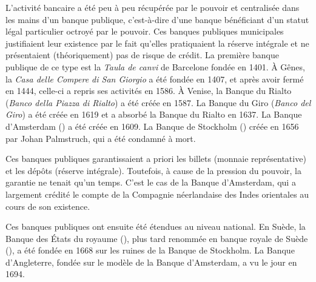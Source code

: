 

L'activité bancaire a été peu à peu récupérée par le pouvoir et centralisée dans les mains d'un banque publique, c'est-à-dire d'une banque bénéficiant d'un statut légal particulier octroyé par le pouvoir. Ces banques publiques municipales justifiaient leur existence par le fait qu'elles pratiquaient la réserve intégrale et ne présentaient (théoriquement) pas de risque de crédit. La première banque publique de ce type est la \emph{Taula de canvi} de Barcelone fondée en 1401. À Gênes, la \emph{Casa delle Compere di San Giorgio} a été fondée en 1407, et après avoir fermé en 1444, celle-ci a repris ses activités en 1586. À Venise, la Banque du Rialto (\emph{Banco della Piazza di Rialto}) a été créée en 1587. La Banque du Giro (\emph{Banco del Giro}) a été créée en 1619 et a absorbé la Banque du Rialto en 1637. La Banque d'Amsterdam () a été créée en 1609. La Banque de Stockholm () créée en 1656 par Johan Palmstruch, qui a été condamné à mort.

Ces banques publiques garantissaient a priori les billets (monnaie représentative) et les dépôts (réserve intégrale). Toutefois, à cause de la pression du pouvoir, la garantie ne tenait qu'un temps. C'est le cas de la Banque d'Amsterdam, qui a largement crédité le compte de la Compagnie néerlandaise des Indes orientales au cours de son existence.

Ces banques publiques ont ensuite été étendues au niveau national. En Suède, la Banque des États du royaume (), plus tard renommée en banque royale de Suède (), a été fondée en 1668 sur les ruines de la Banque de Stockholm. La Banque d'Angleterre, fondée sur le modèle de la Banque d'Amsterdam, a vu le jour en 1694.



